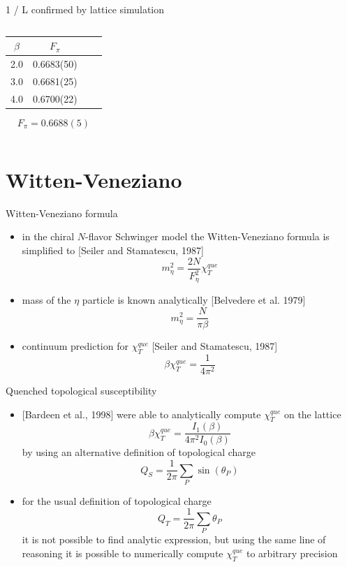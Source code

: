 \documentclass[english]{beamer}
\begin{document}
\begin{frame}{1 / L confirmed by lattice simulation}
\begin{columns}[t]
      \begin{center} 
	    \begin{tabular}{c c c c}
	      $\beta$ & $F_\pi$ \\
	      \hline
	      2.0 & 0.6683(50) \\
	      \hline
	      3.0 & 0.6681(25) \\
	      \hline
	      4.0 & 0.6700(22) \\
	    \end{tabular}
        \[
      	  F_\pi = 0.6688(5)
        \]
      \end{center}	 
  \end{columns}
\end{frame}


\section{Witten-Veneziano}

\begin{frame}{Witten-Veneziano formula}
  \begin{itemize}
    \item in the chiral $N$-flavor Schwinger model the
      Witten-Veneziano formula is simplified to [Seiler and
      Stamatescu, 1987]
      \[
        m_\eta^2 = \frac{2N}{F_\eta^2}\chi_T^{que}
      \]
    \item mass of the $\eta$ particle is known analytically
      [Belvedere et al. 1979] 
      \[
        m_\eta^2 = \frac{N}{\pi\beta}
      \]
    \item continuum prediction for $\chi_T^{que}$
      [Seiler and Stamatescu, 1987]
      \[
        \beta\chi_T^{que} = \frac{1}{4\pi^2}
      \]
  \end{itemize}
\end{frame}

\begin{frame}{Quenched topological susceptibility}
  \begin{itemize}
    \item {[Bardeen et al., 1998]} were able to analytically
      compute $\chi_T^{que}$ on the lattice
      \[
        \beta\chi_T^{que} = \frac{I_1(\beta)}{4 \pi^2 I_0(\beta)}
      \]
      by using an alternative definition of topological charge
      \[
        Q_S = \frac{1}{2\pi}\sum_{P}\sin(\theta_P)
      \]
    \item for the usual definition of topological charge
      \[
        Q_T = \frac{1}{2\pi}\sum_{P}\theta_P
      \]
      it is not possible to find analytic expression, but using the 
      same line of reasoning it is possible to numerically compute
      $\chi_T^{que}$ to arbitrary precision
  \end{itemize}
\end{frame}
\end{document}
